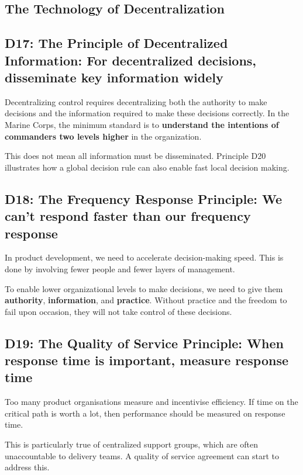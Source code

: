 \documentclass{article}
\begin{document}
\begin{center}
  \section{The Technology of Decentralization}
\end{center}

\begin{multicols}{2}

\subsection{D17: The Principle of Decentralized Information: For decentralized decisions, disseminate key information widely}

Decentralizing control requires decentralizing both the authority to make decisions and the information required to make these decisions correctly. In the Marine Corps, the minimum standard is to \textbf{understand the intentions of commanders two levels higher} in the organization.

This does not mean all information must be disseminated. Principle D20 illustrates how a global decision rule can also enable fast local decision making.

\subsection{D18: The Frequency Response Principle: We can’t respond faster than our frequency response}

In product development, we need to accelerate decision-making speed. This is done by involving fewer people and fewer layers of management.

To enable lower organizational levels to make decisions, we need to give them \textbf{authority}, \textbf{information}, and \textbf{practice}. Without practice and the freedom to fail upon occasion, they will not take control of these decisions.

\subsection{D19: The Quality of Service Principle: When response time is important, measure response time}

Too many product organisations measure and incentivise efficiency. If time on the critical path is worth a lot, then performance should be measured on response time.

This is particularly true of centralized support groups, which are often unaccountable to delivery teams. A quality of service agreement can start to address this.


\end{multicols}
\end{document}
